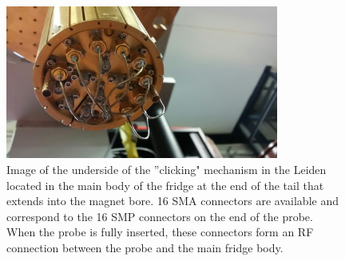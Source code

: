 \begin{figure}
\centering
\includegraphics[width = 0.8\textwidth]{figures/appendix/cryostats/Leiden_clicking.jpg}
\caption{Image of the underside of the ''clicking" mechanism in the Leiden located in the main body of the fridge at the end of the tail that extends into the magnet bore. 16 SMA connectors are available and correspond to the 16 SMP connectors on the end of the probe. When the probe is fully inserted, these connectors form an RF connection between the probe and the main fridge body.}
\label{Fig:Appen:Leiden_clicking}
\end{figure}